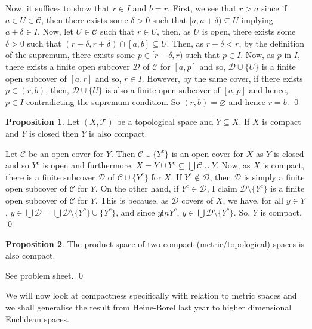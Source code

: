 \documentclass[
]{article}
\theoremstyle{definition}
\newtheorem{prop}{Proposition}
\theoremstyle{definition}
\begin{document}
Now, it suffices to show that \(r \in I\) and \(b = r\). First, we see
that \(r > a\) since if \(a \in U \in \mathcal{C}\), then there exists
some \(\delta > 0\) such that \([a, a + \delta) \subseteq U\) implying
\(a + \delta \in I\). Now, let \(U \in \mathcal{C}\) such that
\(r \in U\), then, as \(U\) is open, there exists some \(\delta > 0\)
such that \((r - \delta, r + \delta) \cap [a, b] \subseteq U\). Then, as
\(r - \delta < r\), by the definition of the supremum, there exists some
\(p \in [r - \delta, r)\) such that \(p \in I\). Now, as \(p\) in \(I\),
there exists a finite open subcover \(\mathcal{D}\) of \(\mathcal{C}\)
for \([a, p]\) and so, \(\mathcal{D} \cup \{U\}\) is a finite open
subcover of \([a, r]\) and so, \(r \in I\). However, by the same cover,
if there exists \(p \in (r, b)\), then, \(\mathcal{D} \cup \{U\}\) is
also a finite open subcover of \([a, p]\) and hence, \(p \in I\)
contradicting the supremum condition. So \((r, b) = \varnothing\) and
hence \(r = b\). \qed

\begin{prop}\label{compact_of_closed}
  Let \((X, \mathcal{T})\) be a topological space and \(Y \subseteq X\). 
  If \(X\) is compact and \(Y\) is closed then \(Y\) is also compact.
\end{prop}
\proof

Let \(\mathcal{C}\) be an open cover for \(Y\). Then
\(\mathcal{C} \cup \{Y^c\}\) is an open cover for \(X\) as \(Y\) is
closed and so \(Y^c\) is open and furthermore,
\(X = Y \cup Y^c \subseteq \bigcup \mathcal{C} \cup Y\). Now, as \(X\)
is compact, there is a finite subcover \(\mathcal{D}\) of
\(\mathcal{C} \cup \{Y^c\}\) for \(X\). If \(Y^c \not\in \mathcal{D}\),
then \(\mathcal{D}\) is simply a finite open subcover of \(\mathcal{C}\)
for \(Y\). On the other hand, if \(Y^c \in \mathcal{D}\), I claim
\(\mathcal{D} \setminus \{Y^c\}\) is a finite open subcover of
\(\mathcal{C}\) for \(Y\). This is because, as \(\mathcal{D}\) covers of
\(X\), we have, for all \(y \in Y\),
\(y \in \bigcup \mathcal{D} =  \bigcup \mathcal{D} \setminus \{Y^c\} \cup \{Y^c\}\),
and since \(y \not in Y^c\),
\(y \in \bigcup \mathcal{D} \setminus \{Y^c\}\). So, \(Y\) is compact.
\qed

\begin{prop}\label{product_compact}
  The product space of two compact (metric/topological) spaces is also compact.
\end{prop}
\proof

See problem sheet. \qed

We will now look at compactness specifically with relation to metric
spaces and we shall generalise the result from Heine-Borel last year to
higher dimensional Euclidean spaces.
\end{document}
